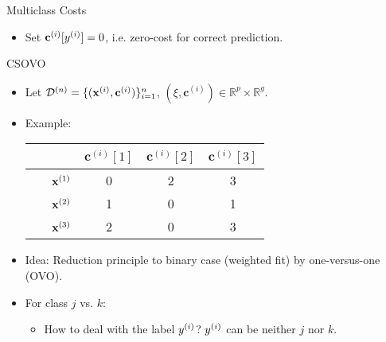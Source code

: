 \documentclass[11pt,compress,t,notes=noshow, xcolor=table]{beamer}
\newcommand{\cv}{\mathbf{c}}
\begin{document}
\begin{vbframe}{Multiclass Costs}
\begin{itemize}
        \item Set $\cv^{(i)}[\yi] = 0$, i.e. zero-cost for correct prediction.
        \vspace{5pt}
        
            
    \end{itemize}
\end{vbframe}

\begin{vbframe}{CSOVO \href{https://proceedings.mlr.press/v39/lin14.pdf}{}}
    

    \begin{itemize}
        \item Let $\D^{(n)} = \{(\xi, \cv^{(i)})\}_{i=1}^n$, $(\xi, \cv^{(i)}) \in \mathbb{R}^p \times \mathbb{R}^g$.  
        \item Example:

                        \begin{center}
                            \begin{tabular}{cc|ccc}\
        			& & $\cv^{(i)}[1]$ & $\cv^{(i)}[2]$ & $\cv^{(i)}[3]$  \\
        			\hline & $\mathbf{x}^{(1)}$ & 0 & 2 & 3\\
        			& $\mathbf{x}^{(2)}$ & 1 & 0 & 1\\
                 	& $\mathbf{x}^{(3)}$ & 2 & 0 & 3\\
                \end{tabular}
        \end{center}
        
        
        \item Idea: Reduction principle to binary case (weighted fit) by one-versus-one (OVO). 
        
        
        \item For class $j$ vs. $k$:
        \begin{itemize}
            \item How to deal with the label $y^{(i)}$? $y^{(i)}$ can be neither $j$ nor $k$.
            \vspace{5pt}
            

\end{itemize}
\end{itemize}
\end{vbframe}
\end{document}
